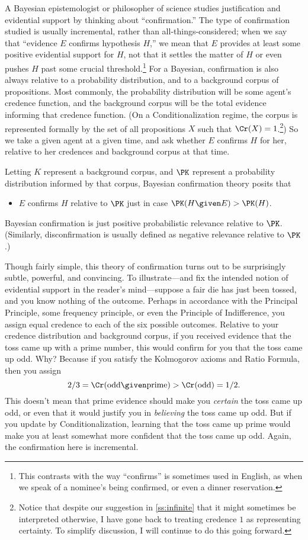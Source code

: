 A Bayesian epistemologist or philosopher of science studies justification and evidential support by thinking about ``confirmation.'' The type of confirmation studied is usually incremental, rather than all-things-considered; when we say that ``evidence $E$ confirms hypothesis $H$,'' we mean that $E$ provides at least some positive evidential support for $H$, not that it settles the matter of $H$ or even pushes $H$ past some crucial threshold.\footnote
{This contrasts with the way ``confirms'' is sometimes used in English, as when we speak of a nominee's being confirmed, or even a dinner reservation.} 
 For a Bayesian, confirmation is also always relative to a probability distribution, and to a background corpus of propositions. Most commonly, the probability distribution will be some agent's credence function, and the background corpus will be the total evidence informing that credence function. (On a Conditionalization regime, the corpus is represented formally by the set of all propositions $X$ such that $\Cr(X)=1$.\footnote
{Notice that despite our suggestion in \autoref{ss:infinite} that it might sometimes be interpreted otherwise, I have gone back to treating credence $1$ as representing certainty. To simplify discussion, I will continue to do this going forward.}) So we take a given agent at a given time, and ask whether $E$ confirms $H$ for her, relative to her credences and background corpus at that time.
 
Letting $K$ represent a background corpus, and $\PK$ represent a probability distribution informed by that corpus, Bayesian confirmation theory posits that  
\begin{itemize}
\item[]{$E$ confirms $H$ relative to $\PK$ just in case $\PK(H \given E)>\PK(H)$.}
\end{itemize}
Bayesian confirmation is just positive probabilistic relevance relative to $\PK$. (Similarly, disconfirmation is usually defined as negative relevance relative to $\PK$.)

Though fairly simple, this theory of confirmation turns out to be surprisingly subtle, powerful, and convincing. To illustrate---and fix the intended notion of evidential support in the reader's mind---suppose a fair die has just been tossed, and you know nothing of the outcome. Perhaps in accordance with the Principal Principle, some frequency principle, or even the Principle of Indifference, you assign equal credence to each of the six possible outcomes. Relative to your credence distribution and background corpus, if you received evidence that the toss came up with a prime number, this would confirm for you that the toss came up odd. Why? Because if you satisfy the Kolmogorov axioms and Ratio Formula, then you assign 
\begin{equation}
2/3=\Cr(\text{odd} \given \text{prime})>\Cr(\text{odd})=1/2.
\end{equation}
This doesn't mean that prime evidence should make you \emph{certain} the toss came up odd, or even that it would justify you in \emph{believing} the toss came up odd. But if you update by Conditionalization, learning that the toss came up prime would make you at least somewhat more confident that the toss came up odd. Again, the confirmation here is incremental.

